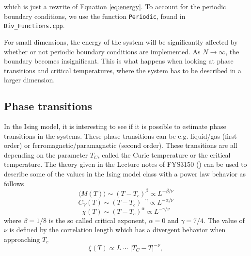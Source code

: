 \documentclass[12pt,english,a4paper]{article}
\begin{document}
\noindent which is just a rewrite of Equation \eqref{eq:energy}. To account for the periodic boundary conditions, we use the function \texttt{Periodic}, found in \texttt{Div\_Functions.cpp}.

For small dimensions, the energy of the system will be significantly affected by whether or not periodic boundary conditions are implemented. As $N \rightarrow \infty$, the boundary becomes insignificant. This is what happens when looking at phase transitions and critical temperatures, where the system has to be described in a larger dimension.


\subsection{Phase transitions}
In the Ising model, it is interesting to see if it is possible to estimate phase transitions in the systems. These phase transitions can be e.g. liquid/gas (first order) or ferromagnetic/paramagnetic (second order). These transitions are all depending on the parameter $T_C$, called the Curie temperature or the critical temperature. The theory given in the Lecture notes of FYS3150 (\cite{LectureIsing}) can be used to describe some of the values in the Ising model class with a power law behavior as follows
\begin{equation}
    \langle M(T)\rangle\sim (T-T_c)^\beta \propto L^{-\beta/\nu}
\end{equation}
\begin{equation}
    C_V(T)\sim (T-T_c)^{-\gamma} \propto L^{-\alpha/\nu}
\end{equation}
\begin{equation}
    \chi(T)\sim (T-T_c)^\alpha \propto L^{-\gamma/\nu}
\end{equation}
where $\beta = 1/8$ is the so called critical exponent, $\alpha = 0$ and $\gamma = 7/4$. The value of $\nu$ is defined by the correlation length which has a divergent behavior when approaching $T_c$
\begin{equation}
      \xi(T) \propto L \sim \left|T_C-T\right|^{-\nu},
  \label{eq:xi}
\end{equation}
\end{document}
